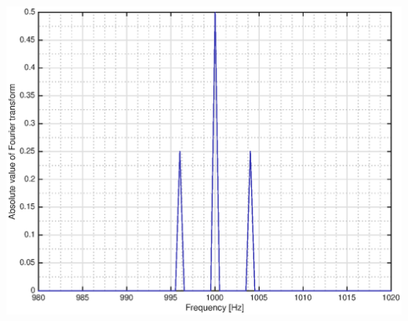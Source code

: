 \documentclass{beamer}
\begin{document}
\begin{frame}
\begin{columns}
\begin{column}{0.175\textwidth}
      \includegraphics[height=0.25\textheight]{am_frequency}
    \end{column}
  \end{columns}

  \vspace{2mm}


\end{frame}
\end{document}
